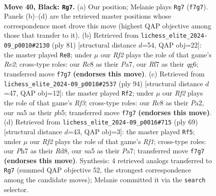 \documentclass[11pt]{article}
\begin{document}
\clearpage

\begin{figure}[p]\centering
\begin{subfigure}{0.46\textwidth}\centering
\resizebox{\linewidth}{!}{%
\newchessgame
\chessboard[
  setfen={2r3k1/5r1p/8/Np6/3Q2PP/8/PP3PK1/3R4 b - - 2 40},
  showmover=false,
  pgfstyle=straightmove, color=movearrow, markmove={f7-g7}
]}
\caption{}
\end{subfigure}\hfill
\begin{subfigure}{0.46\textwidth}\centering
\resizebox{\linewidth}{!}{%
\newchessgame
\chessboard[
  setfen={8/p2kr2P/2p3Q1/8/2P5/4PpP1/PB3P1K/8 b - - 0 41},
  showmover=false,
  pgfstyle=straightmove, color=movearrow, markmove={e7-e8}
]}
\caption{}
\end{subfigure}
\\[4pt]
\begin{subfigure}{0.46\textwidth}\centering
\resizebox{\linewidth}{!}{%
\newchessgame
\chessboard[
  setfen={8/8/p2p2kp/1p2qp2/8/2P2R1P/PP4K1/8 w - - 0 48},
  showmover=false,
  pgfstyle=straightmove, color=movearrow, markmove={f3-f2}
]}
\caption{}
\end{subfigure}\hfill
\begin{subfigure}{0.46\textwidth}\centering
\resizebox{\linewidth}{!}{%
\newchessgame
\chessboard[
  setfen={3r1r2/p7/1p4k1/3pQ3/8/4P3/PP3PKP/8 b - - 7 35},
  showmover=false,
  pgfstyle=straightmove, color=movearrow, markmove={f8-f5}
]}
\caption{}
\end{subfigure}
\caption{\textbf{Move 40, Black: \texttt{Rg7}.} (a) Our position; Melanie plays \texttt{Rg7} (\texttt{f7g7}). Panels (b)--(d) are the retrieved master positions whose correspondence most drove this move (highest QAP objective among those that transfer to it). (b) Retrieved from \texttt{lichess\_elite\_2024-09\_p0010\#2130} (ply 81) [structural distance $d$=54, QAP obj=22]: the master played \texttt{Re8}; under $\mu$ our \emph{Rf2} plays the role of that game's \emph{Re2}; cross-type roles: our \emph{R}c8 as their \emph{P}a7, our \emph{R}f7 as their \emph{q}g6; transferred move \texttt{f7g7} \textbf{(endorses this move)}. (c) Retrieved from \texttt{lichess\_elite\_2024-09\_p0018\#2537} (ply 94) [structural distance $d$=47, QAP obj=12]: the master played \texttt{Rf2}; under $\mu$ our \emph{Rf2} plays the role of that game's \emph{Rf3}; cross-type roles: our \emph{R}c8 as their \emph{P}a2, our \emph{n}a5 as their \emph{p}b5; transferred move \texttt{f7g7} \textbf{(endorses this move)}. (d) Retrieved from \texttt{lichess\_elite\_2024-09\_p0016\#715} (ply 69) [structural distance $d$=43, QAP obj=3]: the master played \texttt{Rf5}; under $\mu$ our \emph{Rf2} plays the role of that game's \emph{Rf1}; cross-type roles: our \emph{P}h7 as their \emph{R}d8, our \emph{n}a5 as their \emph{P}a7; transferred move \texttt{f7g7} \textbf{(endorses this move)}. Synthesis: 4 retrieved analogs transferred to \texttt{Rg7} (summed QAP objective 52, the strongest correspondence among the candidate moves); Melanie committed it via the \texttt{search} selector.}
\label{fig:thought-m79}
\end{figure}
\end{document}
